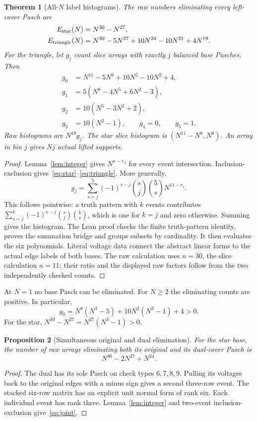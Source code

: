 \documentclass[11pt]{article}
\newtheorem{theorem}{Theorem}[section]
\newtheorem{proposition}[theorem]{Proposition}
\begin{document}
\begin{theorem}[All-$N$ label histograms]\label{thm:hist}
The raw numbers eliminating every left-cover Pasch are
\begin{align}
 E_{\rm star}(N)&=N^{30}-N^{27},\label{eq:star}\\
 E_{\rm triangle}(N)&=N^{30}-5N^{27}+10N^{24}-10N^{21}+4N^{19}.\label{eq:triangle}
\end{align}
For the triangle, let $g_j$ count slice arrays with exactly $j$ balanced
base Pasches. Then
\begin{align*}
 g_0&=N^{11}-5N^8+10N^5-10N^2+4,\\
 g_1&=5(N^8-4N^5+6N^2-3),\\
 g_2&=10(N^5-3N^2+2),\\
 g_3&=10(N^2-1),\qquad g_4=0,\qquad g_5=1.
\end{align*}
Raw histograms are $N^{19}g_j$. The star slice histogram is
$(N^{11}-N^8,N^8)$. An array in bin $j$ gives $Nj$ actual lifted supports.
\end{theorem}
\begin{proof}
Lemma~\ref{lem:integer} gives $N^{n-r_J}$ for every event intersection.
Inclusion-exclusion gives~\eqref{eq:star}--\eqref{eq:triangle}. More generally,
\[
 g_j=\sum_{s=j}^{5}(-1)^{s-j}\binom{s}{j}\binom{5}{s}N^{11-r_s}.
\]
This follows pointwise: a truth pattern with $k$ events contributes
$\sum_{s=j}^k(-1)^{s-j}\binom{s}{j}\binom{k}{s}$, which is one for $k=j$
and zero otherwise. Summing gives the histogram. The Lean proof checks the
finite truth-pattern identity, proves the summation bridge and groups subsets
by cardinality. It then evaluates the six polynomials. Literal voltage data
connect the abstract linear forms to the actual edge labels of both bases.
The raw calculation uses $n=30$, the slice calculation $n=11$; their ratio
and the displayed raw factors follow from the two independently checked counts.
\end{proof}

At $N=1$ no base Pasch can be eliminated. For $N\geq2$ the eliminating counts
are positive. In particular,
\[
 g_0=N^8(N^3-5)+10N^2(N^3-1)+4>0.
\]
For the star, $N^{30}-N^{27}=N^{27}(N^3-1)>0$.

\begin{proposition}[Simultaneous original and dual elimination]\label{prop:joint}
For the star base, the number of raw arrays eliminating both its original and
its dual-cover Pasch is
\begin{equation}\label{eq:joint}
 N^{30}-2N^{27}+N^{24}.
\end{equation}
\end{proposition}
\begin{proof}
The dual has its sole Pasch on check types $6,7,8,9$. Pulling its voltages back
to the original edges with a minus sign gives a second three-row event. The
stacked six-row matrix has an explicit unit normal form of rank six. Each
individual event has rank three. Lemma~\ref{lem:integer} and two-event
inclusion-exclusion give~\eqref{eq:joint}.
\end{proof}
\end{document}
